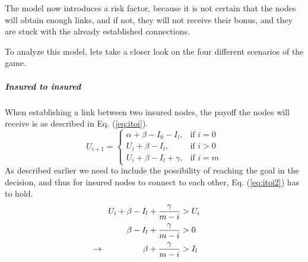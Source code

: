  The model now introduces a risk factor, because it is not certain that the nodes will obtain enough links, and if not, they will not receive their bonus, and they are stuck with the already established connections. 

To analyze this model, lets take a closer look on the four different scenarios of the game.
\subparagraph{Insured to insured}
When establishing a link between two insured nodes, the payoff the nodes will receive is as described in Eq. (\ref{eq:itoi}).
\begin{equation}
    U_{i+1}= 
\begin{cases}
    \alpha + \beta - I_{0} - I_{l},& \text{if } i = 0\\
    U_{i}+\beta -I_{l},& \text{if }  i>0\\
    U_{i}+\beta -I_{l}+\gamma,& \text{if } i=m
    
\end{cases}
\label{eq:itoi}
\end{equation}
As described earlier we need to include the possibility of reaching the goal in the decision, and thus for insured nodes to connect to each other, Eq. (\ref{eq:itoi2}) has to hold.
\begin{eqnarray}
U_{i}+\beta-I_{l}+\frac{\gamma}{m-i}&>U_{i} \nonumber \\ 
\beta-I_{l}+\frac{\gamma}{m-i}&>0 \nonumber \\ 
\llap{$\rightarrow$\hspace{50pt}} \beta+\frac{\gamma}{m-i}&>I_{l} 
\label{eq:itoi2}
\end{eqnarray}


